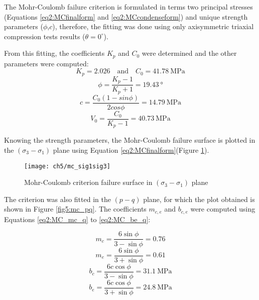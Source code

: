 The Mohr-Coulomb failure criterion is formulated in terms two principal stresses (Equations \ref{eq2:MCfinalform} and \ref{eq2:MCcondenseform}) and unique strength parameters ($\phi$,$c$), therefore, the fitting was done using only axisymmetric triaxial compression tests results ($\theta = 0^\circ$). 

From this fitting, the coefficients $K_p$ and $C_0$ were determined and the other parameters were computed: 
\begin{equation}
    K_p = 2.026 \quad \textrm{and} \quad C_0 = \SI{41.78}{\mega\pascal}
\end{equation}
\begin{equation}
    \phi = \frac{K_p-1}{K_p+1} = \SI{19.43}{\degree}
\end{equation}
\begin{equation}
    c = \frac{C_0(1-sin\phi)}{2cos\phi} = \SI{14.79}{\mega\pascal}
\end{equation}
\begin{equation}
    V_0 = \frac{C_0}{K_p-1} = \SI{40.73}{\mega\pascal}
\end{equation}

Knowing the strength parameters, the Mohr-Coulomb failure surface is plotted in the $(\sigma_3-\sigma_1)$ plane using Equation \ref{eq2:MCfinalform}(Figure \ref{fig5:mc_sig1sig3}).

\begin{figure}[p]
    \centering
    \texttt{[image: ch5/mc\_sig1sig3]}
    \caption{Mohr-Coulomb criterion failure surface in  $(\sigma_3-\sigma_1)$ plane}
    \label{fig5:mc_sig1sig3}
\end{figure} 

The criterion was also fitted in the $(p-q)$ plane, for which the plot obtained is shown in Figure \ref{fig5:mc_pq}. The coefficients $m_{c,e}$ and $b_{c,e}$ were computed using Equations \ref{eq2:MC_mc_q} to \ref{eq2:MC_be_q}:

\begin{equation}
    m_c = \frac{6 \sin \phi}{3-\sin \phi} = 0.76
\end{equation}
\begin{equation}
    m_e = \frac{6 \sin \phi}{3+\sin \phi} = 0.61
\end{equation}
\begin{equation}
    b_c = \frac{6 c \cos \phi}{3-\sin \phi} = \SI{31.1}{\mega\pascal}
\end{equation}
\begin{equation}
    b_e = \frac{6 c \cos \phi}{3+\sin \phi} = \SI{24.8}{\mega\pascal}
\end{equation}

